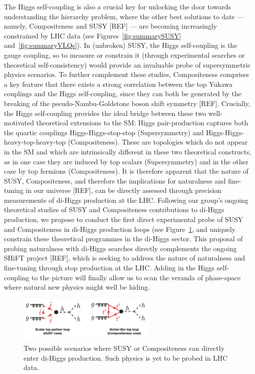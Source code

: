\documentclass[10pt,oneside,notitlepage,abstracton,a4paper]{scrartcl}
\begin{document}
The Higgs self-coupling is also a crucial key for unlocking the door towards understanding the hierarchy problem, where the other best solutions to date — namely, Compositeness and SUSY [REF] — are becoming increasingly constrained by LHC data (see Figures~\ref{fig:summarySUSY} and~\ref{fig:summaryVLQs}). In (unbroken) SUSY, the Higgs self-coupling is the gauge coupling, so to measure or constrain it (through experimental searches or theoretical self-consistency) would provide an invaluable probe of supersymmetric physics scenarios. To further complement these studies, Compositeness comprises a key feature that there exists a strong correlation between the top Yukawa couplings and the Higgs self-coupling, since they can both be generated by the breaking of the pseudo-Nambu-Goldstone boson shift symmetry [REF]. Crucially, the Higgs self-coupling provides the ideal bridge between these two well-motivated theoretical extensions to the SM: Higgs pair-production captures both the quartic couplings Higgs-Higgs-stop-stop (Supersymmetry) and Higgs-Higgs-heavy-top-heavy-top (Compositeness). These are topologies which do not appear in the SM and which are intrinsically different in these two theoretical constructs, as in one case they are induced by top scalars (Supersymmetry) and in the other case by top fermions (Compositeness). It is therefore apparent that the nature of SUSY, Compositeness, and therefore the implications for naturalness and fine-tuning in our universe [REF], can be directly assessed through precision measurements of di-Higgs production at the LHC. Following our group's ongoing theoretical studies of SUSY and Compositeness contributions to di-Higgs production, we propose to conduct the first direct experimental probe of SUSY and Compositeness in di-Higgs production loops (see Figure~\ref{fig:diHiggsLoops}, and uniquely constrain these theoretical programmes in the di-Higgs sector. This proposal of probing naturalness with di-Higgs searches directly complements the ongoing SHiFT project [REF], which is seeking to address the nature of naturalness and fine-tuning through stop production at the LHC. Adding in the Higgs self-coupling to the picture will finally allow us to scan the veranda of phase-space where natural new physics might well be hiding. \\

\begin{figure}[!ht]
\centering
\includegraphics[width=0.6\textwidth]{Figures/diHiggsLoops}
\caption{Two possible scenarios where SUSY or Compositeness can directly enter di-Higgs production. Such physics is yet to be probed in LHC data.}
\label{fig:diHiggsLoops}
\end{figure}
\end{document}
